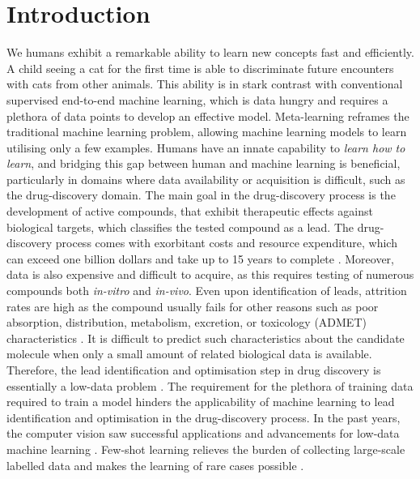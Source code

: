 \documentclass[journal=acscii,manuscript=article]{achemso}
\begin{document}
\section{Introduction}

We humans exhibit a remarkable ability to learn new concepts fast and efficiently. A child seeing a cat for the first time is able to discriminate future encounters with cats from other animals. This ability is in stark contrast with conventional supervised end-to-end machine learning, which is data hungry and requires a plethora of data points to develop an effective model. Meta-learning reframes the traditional machine learning problem, allowing machine learning models to learn utilising only a few examples. Humans have an innate capability to \textit{learn how to learn}, and bridging this gap between human and machine learning is beneficial, particularly in domains where data availability or acquisition is difficult, such as the drug-discovery domain. The main goal in the drug-discovery process is the development of active compounds, that exhibit therapeutic effects against biological targets, which classifies the tested compound as a lead. The drug-discovery process comes with exorbitant costs and resource expenditure, which can exceed one billion dollars and take up to 15 years to complete \cite{hughes2011principles}. Moreover, data is also expensive and difficult to acquire, as this requires testing of numerous compounds both \textit{in-vitro} and \textit{in-vivo}. Even upon identification of leads, attrition rates are high as the compound usually fails for other reasons such as poor absorption, distribution, metabolism, excretion, or toxicology (ADMET) characteristics \cite{waring2015analysis}. It is difficult to predict such characteristics about the candidate molecule when only a small amount of related biological data is available. Therefore, the lead identification and optimisation step in drug discovery is essentially a low-data problem \cite{altae2017low}. The requirement for the plethora of training data required to train a model hinders the applicability of machine learning to lead identification and optimisation in the drug-discovery process. In the past years, the computer vision saw successful applications and advancements for low-data machine learning \cite{koch2015siamese, vinyals2016matching, snell2017prototypical, sung2018learning}. Few-shot learning relieves the burden of collecting large-scale labelled data and makes the learning of rare cases possible \cite{wang2020generalizing}. 
\end{document}
